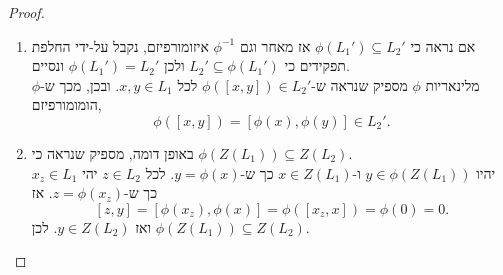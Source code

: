 \documentclass{report}
\theoremstyle{break}
\theoremstyle{MyNonumberbreak}
\newtheorem{proof}{הוכחה}
\begin{document}
\begin{proof}
\begin{enumerate}
	\item 
	אם נראה כי $\phi(L_1') \subseteq L_2'$ אז מאחר וגם $\phi^{-1}$ איזומורפיזם, נקבל על-ידי החלפת תפקידים כי $L_2' \subseteq \phi(L_1')$ ולכן $\phi(L_1') = L_2'$ ונסיים. \\
	מלינאריות $\phi$ מספיק שנראה ש-$\phi([x, y]) \in L_2'$ לכל $x, y \in L_1$. ובכן, מכך ש-$\phi$ הומומורפיזם, 
	\[ \phi([x, y]) = [\phi(x), \phi(y)] \in L_2'. \]
	\item
	באופן דומה, מספיק שנראה כי $\phi(Z(L_1)) \subseteq Z(L_2)$. \\	
	יהיו $y \in \phi(Z(L_1))$ ו-$x \in Z(L_1)$ כך ש-$y = \phi(x)$. לכל $z \in L_2$ יהי $x_z \in L_1$ כך ש-$z = \phi(x_z)$. אז
\[ [z, y] = [\phi(x_z), \phi(x)] = \phi([x_z, x]) = \phi(0) = 0. \]
ואז $y \in Z(L_2)$. לכן $\phi(Z(L_1)) \subseteq Z(L_2)$.
\end{enumerate}
\end{proof}
\end{document}
